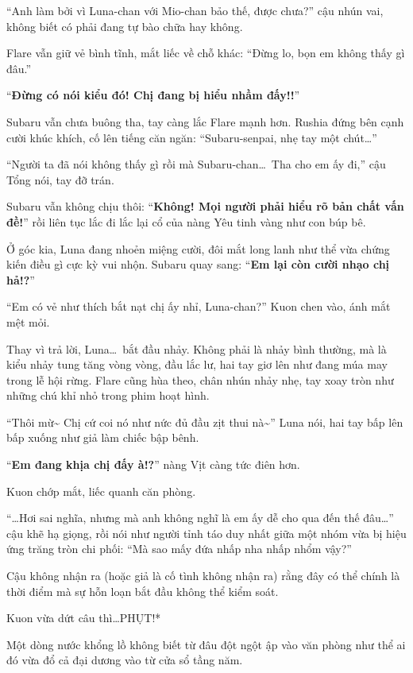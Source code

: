 \documentclass[../main.tex]{subfiles}
\begin{document}
``Anh làm bởi vì Luna-chan với Mio-chan bảo thế, được chưa?'' cậu nhún vai, không biết có phải đang tự bào chữa hay không.

Flare vẫn giữ vẻ bình tĩnh, mắt liếc về chỗ khác: ``Đừng lo, bọn em không thấy gì đâu.''

``\textbf{Đừng có nói kiểu đó! Chị đang bị hiểu nhầm đấy!!}''

Subaru vẫn chưa buông tha, tay càng lắc Flare mạnh hơn. Rushia đứng bên cạnh cười khúc khích, cố lên tiếng căn ngăn: ``Subaru-senpai, nhẹ tay một chút\dots''

``Người ta đã nói không thấy gì rồi mà Subaru-chan\dots\ Tha cho em ấy đi,'' cậu Tổng nói, tay đỡ trán.

Subaru vẫn không chịu thôi: ``\textbf{Không! Mọi người phải hiểu rõ bản chất vấn đề!}'' rồi liên tục lắc đi lắc lại cổ của nàng Yêu tinh vàng như con búp bê.

Ở góc kia, Luna đang nhoẻn miệng cười, đôi mắt long lanh như thể vừa chứng kiến điều gì cực kỳ vui nhộn. Subaru quay sang: ``\textbf{Em lại còn cười nhạo chị hả!?}''

``Em có vẻ như thích bắt nạt chị ấy nhỉ, Luna-chan?'' Kuon chen vào, ánh mắt mệt mỏi.

Thay vì trả lời, Luna\dots\ bắt đầu nhảy. Không phải là nhảy bình thường, mà là kiểu nhảy tung tăng vòng vòng, đầu lắc lư, hai tay giơ lên như đang múa may trong lễ hội rừng. Flare cũng hùa theo, chân nhún nhảy nhẹ, tay xoay tròn như những chú khỉ nhỏ trong phim hoạt hình.

``Thôi mừ\~{} Chị cứ coi nó như nức đủ đầu zịt thui nà\~{}'' Luna nói, hai tay bấp lên bấp xuống như giả làm chiếc bập bênh.

``\textbf{Em đang khịa chị đấy à!?}'' nàng Vịt càng tức điên hơn.

Kuon chớp mắt, liếc quanh căn phòng.

``\dots Hơi sai nghĩa, nhưng mà anh không nghĩ là em ấy dễ cho qua đến thế đâu\dots'' cậu khẽ hạ giọng, rồi nói như người tỉnh táo duy nhất giữa một nhóm vừa bị hiệu ứng trăng tròn chi phối: ``Mà sao mấy đứa nhấp nha nhấp nhổm vậy?''

Cậu không nhận ra (hoặc giả là cố tình không nhận ra) rằng đây có thể chính là thời điểm mà sự hỗn loạn bắt đầu không thể kiểm soát.

Kuon vừa dứt câu thì\dots *PHỤT!*

Một dòng nước khổng lồ không biết từ đâu đột ngột ập vào văn phòng như thể ai đó vừa đổ cả đại dương vào từ cửa sổ tầng năm.
\end{document}
